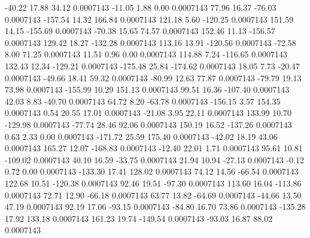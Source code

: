       -40.22       17.88       34.12     0.0007143
      -11.05        1.88        0.00     0.0007143
       77.96       16.37      -76.03     0.0007143
     -157.54       14.32      166.84     0.0007143
      121.18        5.60     -120.25     0.0007143
      151.59       14.15     -155.69     0.0007143
      -70.38       15.65       74.57     0.0007143
      152.46       11.13     -156.57     0.0007143
      129.42       18.27     -132.28     0.0007143
      113.16       13.91     -120.56     0.0007143
      -72.58        8.00       71.25     0.0007143
       11.51        0.96        0.00     0.0007143
      114.88        7.24     -116.65     0.0007143
      132.43       12.34     -129.21     0.0007143
     -175.48       25.84     -174.62     0.0007143
       18.05        7.73      -20.47     0.0007143
      -49.66       18.41       59.32     0.0007143
      -80.99       12.63       77.87     0.0007143
      -79.79       19.13       73.98     0.0007143
     -155.99       10.29      151.13     0.0007143
       99.51       16.36     -107.40     0.0007143
       42.03        8.83      -40.70     0.0007143
       64.72        8.20      -63.78     0.0007143
     -156.15        3.57      154.35     0.0007143
        0.54       20.55       17.01     0.0007143
      -21.08        3.95       22.11     0.0007143
      133.99       10.70     -129.98     0.0007143
      -77.74       28.46       92.06     0.0007143
      150.19       16.52     -137.26     0.0007143
        0.63        2.33        0.00     0.0007143
     -171.72       25.59      175.40     0.0007143
      -42.02       18.19       43.06     0.0007143
      165.27       12.07     -168.83     0.0007143
      -12.40       22.01        1.71     0.0007143
       95.61       10.81     -109.02     0.0007143
       40.10       16.59      -33.75     0.0007143
       21.94       10.94      -27.13     0.0007143
       -0.12        0.72        0.00     0.0007143
     -133.30       17.41      128.02     0.0007143
       74.12       14.56      -66.54     0.0007143
      122.68       10.51     -120.38     0.0007143
       92.46       19.51      -97.30     0.0007143
      113.60       16.04     -113.86     0.0007143
       72.71       12.90      -66.18     0.0007143
       63.77       13.82      -64.69     0.0007143
      -44.66       13.50       47.19     0.0007143
       92.19       17.06      -93.15     0.0007143
      -84.80       16.70       73.86     0.0007143
     -135.28       17.92      133.18     0.0007143
      161.23       19.74     -149.54     0.0007143
      -93.03       16.87       88.02     0.0007143
